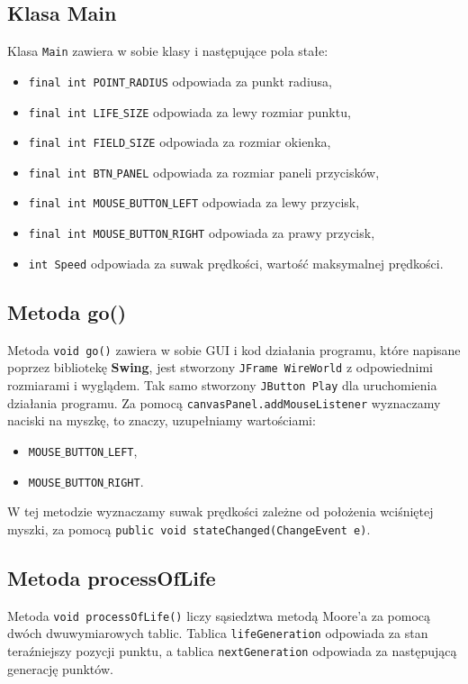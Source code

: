 \documentclass[a4paper, 12pt]{article}
\begin{document}
		\subsection{Klasa Main}
			\hspace*{1cm} Klasa \texttt{Main} zawiera w sobie klasy i następujące pola stałe:
		\begin{itemize}
			\item \texttt{final int POINT$\_$RADIUS} odpowiada za punkt radiusa,
			\item \texttt{final int LIFE$\_$SIZE} odpowiada za lewy rozmiar punktu,
			\item \texttt{final int FIELD$\_$SIZE} odpowiada za rozmiar okienka,
			\item \texttt{final int BTN$\_$PANEL} odpowiada za rozmiar paneli przycisków,
			\item \texttt{final int MOUSE$\_$BUTTON$\_$LEFT} odpowiada za lewy przycisk,
			\item \texttt{final int MOUSE$\_$BUTTON$\_$RIGHT} odpowiada za prawy przycisk,
			\item \texttt{int Speed} odpowiada za suwak prędkości, wartość maksymalnej prędkości.
		\end{itemize}
			
		\subsection{Metoda go()}
			\hspace*{1cm} Metoda \texttt{void go()} zawiera w sobie GUI i kod działania programu, które napisane poprzez bibliotekę \textbf{Swing}, jest stworzony \texttt{JFrame WireWorld} z odpowiednimi rozmiarami i wyglądem. Tak samo stworzony \texttt{JButton Play} dla uruchomienia działania programu.\newline
			\hspace*{1cm} Za pomocą \texttt{canvasPanel.addMouseListener} wyznaczamy naciski na myszkę, to znaczy, uzupełniamy wartościami:
		\begin{itemize}
			\item \texttt{MOUSE$\_$BUTTON$\_$LEFT},
			\item \texttt{MOUSE$\_$BUTTON$\_$RIGHT}.
		\end{itemize}		
			\hspace*{1cm} W tej metodzie  wyznaczamy suwak prędkości zależne od położenia wciśniętej myszki, za pomocą \texttt{public void stateChanged(ChangeEvent e)}.	
		
		\subsection{Metoda processOfLife}
			\hspace*{1cm} Metoda \texttt{void processOfLife()} liczy sąsiedztwa metodą Moore'a za pomocą dwóch dwuwymiarowych tablic. Tablica \texttt{lifeGeneration} odpowiada za stan teraźniejszy pozycji punktu, a tablica \texttt{nextGeneration} odpowiada za następującą generację punktów.
		
\end{document}
